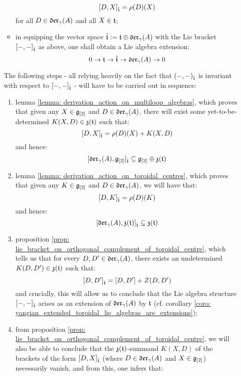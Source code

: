 \begin{itemize}
\begin{itemize}
                    $$[D, X]_{\hat{\mathfrak{t}}} = \rho(D)(X)$$
                for all $D \in \mathfrak{der}_{\gamma}(A)$ and all $X \in \mathfrak{t}$;
                \item in equipping the vector space $\hat{\mathfrak{t}} := \mathfrak{t} \oplus \mathfrak{der}_{\gamma}(A)$ with the Lie bracket $[-, -]_{\hat{\mathfrak{t}}}$ as above, one shall obtain a Lie algebra extension:
                    $$0 \to \mathfrak{t} \to \hat{\mathfrak{t}} \to \mathfrak{der}_{\gamma}(A) \to 0$$
            \end{itemize}
            The following steps - all relying heavily on the fact that $(-, -)_{\hat{\mathfrak{t}}}$ is invariant with respect to $[-, -]_{\hat{\mathfrak{t}}}$ - will have to be carried out in sequence:
            \begin{enumerate}
                \item lemma \ref{lemma: derivation_action_on_multiloop_algebras}, which proves that given any $X \in \mathfrak{g}_{[2]}$ and $D \in \mathfrak{der}_{\gamma}(A)$, there will exist some yet-to-be-determined $K(X, D) \in \mathfrak{z}(\mathfrak{t})$ such that:
                    $$[D, X]_{\hat{\mathfrak{t}}} = \rho(D)(X) + K(X, D)$$
                and hence:
                    $$[\mathfrak{der}_{\gamma}(A), \mathfrak{g}_{[2]}]_{\hat{\mathfrak{t}}} \subseteq \mathfrak{g}_{[2]} \oplus \mathfrak{z}(\mathfrak{t})$$
                \item lemma \ref{lemma: derivation_action_on_toroidal_centres}, which proves that given any $K \in \mathfrak{g}_{[2]}$ and $D \in \mathfrak{der}_{\gamma}(A)$, we will have that:
                    $$[D, K]_{\hat{\mathfrak{t}}} = \rho(D)(K)$$
                and hence:
                    $$[\mathfrak{der}_{\gamma}(A), \mathfrak{z}(\mathfrak{t})]_{\hat{\mathfrak{t}}} \subseteq \mathfrak{z}(\mathfrak{t})$$
                \item proposition \ref{prop: lie_bracket_on_orthogonal_complement_of_toroidal_centre}, which tells us that for every $D, D' \in \mathfrak{der}_{\gamma}(A)$, there exists an undetermined $K(D, D') \in \mathfrak{z}(\mathfrak{t})$ such that:
                    $$[D, D']_{\hat{\mathfrak{t}}} = [D, D'] + Z(D, D')$$
                and crucially, this will allow us to conclude that the Lie algebra structure $[-, -]_{\hat{\mathfrak{t}}}$ arises as an extension of $\mathfrak{der}_{\gamma}(A)$ by $\mathfrak{t}$ (cf. corollary \ref{coro: yangian_extended_toroidal_lie_algebras_are_extensions});
                \item from proposition \ref{prop: lie_bracket_on_orthogonal_complement_of_toroidal_centre}, we will also be able to conclude that the $\mathfrak{z}(\mathfrak{t})$-summand $K(X, D)$ of the brackets of the form $[D, X]_{\hat{\mathfrak{t}}}$ (where $D \in \mathfrak{der}_{\gamma}(A)$ and $X \in \mathfrak{g}_{[2]}$) necessarily vanish, and from this, one infers that:

\end{enumerate}
\end{itemize}
